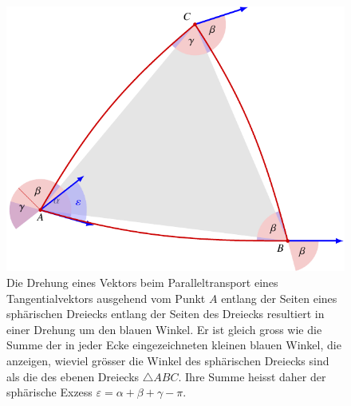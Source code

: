 %
%
%
\begin{figure}
\centering
\includegraphics{chapters/110-kruemmung/images/drehung.pdf}
\caption{Die Drehung eines Vektors beim Paralleltransport eines
Tangentialvektors ausgehend vom Punkt $A$ entlang der Seiten eines
sphärischen Dreiecks entlang der Seiten des Dreiecks resultiert
in einer Drehung um den blauen Winkel.
Er ist gleich gross wie die Summe der in jeder Ecke eingezeichneten
kleinen blauen Winkel, die anzeigen, wieviel grösser die Winkel
des sphärischen Dreiecks sind als die des ebenen Dreiecks
$\triangle ABC$.
Ihre Summe heisst daher der sphärische Exzess
$\varepsilon = \alpha+\beta+\gamma-\pi$.
\label{buch:kruemmung:fig:drehung}}
\end{figure}
